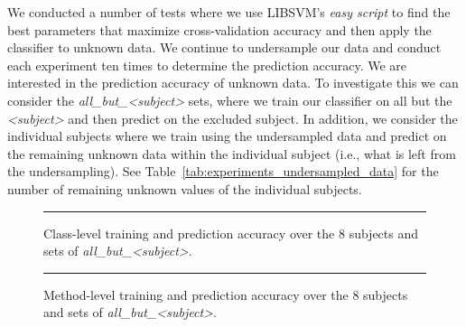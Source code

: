 We conducted a number of tests where we use LIBSVM's \emph{easy script} to find the best parameters that maximize cross-validation accuracy and then apply the classifier to unknown data. We continue to undersample our data and conduct each experiment ten times to determine the prediction accuracy. We are interested in the prediction accuracy of unknown data. To investigate this we can consider the \emph{all\_but\_<subject>} sets, where we train our classifier on all but the \emph{<subject>} and then predict on the excluded subject. In addition, we consider the individual subjects where we train using the undersampled data and predict on the remaining unknown data within the individual subject (i.e., what is left from the undersampling). See Table~\ref{tab:experiments_undersampled_data} for the number of remaining unknown values of the individual subjects.

\begin{figure}[!ht]
  \centering
  \begin{adjustbox}{max size={.95\textwidth}{.95\textheight}}
    
  \end{adjustbox}
  \caption{Class-level training and prediction accuracy over the 8 subjects and sets of \emph{all\_but\_<subject>}.}
  \vspace{2mm}
  \hrule
  \label{fig:prediction_class_graph}
\end{figure}

\begin{figure}[!ht]
  \centering
  \begin{adjustbox}{max size={.95\textwidth}{.95\textheight}}
    
  \end{adjustbox}
  \caption{Method-level training and prediction accuracy over the 8 subjects and sets of \emph{all\_but\_<subject>}.}
  \vspace{2mm}
  \hrule
  \label{fig:prediction_method_graph}
\end{figure}

